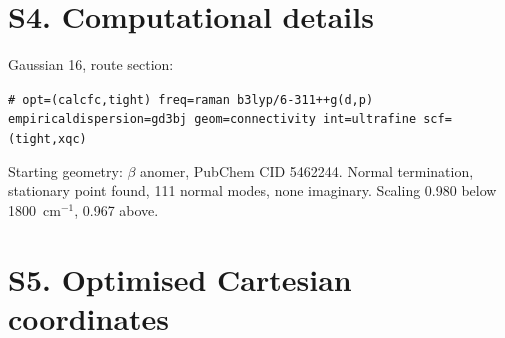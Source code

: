 \documentclass[11pt,a4paper]{article}
\newcommand{\wn}{\ensuremath{\mathrm{cm}^{-1}}}
\begin{document}
\section*{S4. Computational details}
Gaussian 16, route section:
\begin{center}
\texttt{\# opt=(calcfc,tight) freq=raman b3lyp/6-311++g(d,p)}\\
\texttt{empiricaldispersion=gd3bj geom=connectivity int=ultrafine scf=(tight,xqc)}
\end{center}
Starting geometry: $\beta$ anomer, PubChem CID 5462244. Normal termination,
stationary point found, 111 normal modes, none imaginary. Scaling 0.980 below
1800~\wn{}, 0.967 above.

\section*{S5. Optimised Cartesian coordinates}
\end{document}

